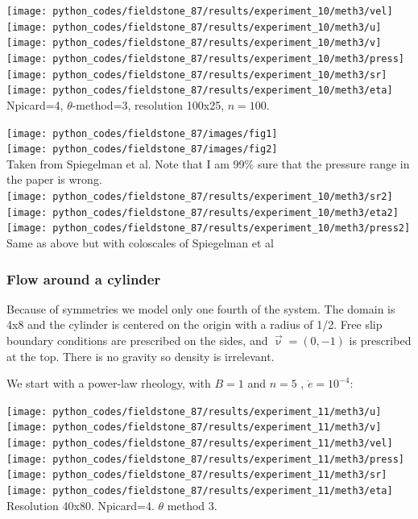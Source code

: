 \begin{center}
\texttt{[image: python\_codes/fieldstone\_87/results/experiment\_10/meth3/vel]}
\texttt{[image: python\_codes/fieldstone\_87/results/experiment\_10/meth3/u]}
\texttt{[image: python\_codes/fieldstone\_87/results/experiment\_10/meth3/v]}\\
\texttt{[image: python\_codes/fieldstone\_87/results/experiment\_10/meth3/press]}
\texttt{[image: python\_codes/fieldstone\_87/results/experiment\_10/meth3/sr]}
\texttt{[image: python\_codes/fieldstone\_87/results/experiment\_10/meth3/eta]}\\
{\captionfont Npicard=4, $\theta$-method=3, resolution 100x25, $n=100$.}
\end{center}

\begin{center}
\texttt{[image: python\_codes/fieldstone\_87/images/fig1]}\\
\texttt{[image: python\_codes/fieldstone\_87/images/fig2]}\\
{\captionfont Taken from Spiegelman et al. Note that I am 99\% sure that the pressure range in the paper is wrong.}\\
\texttt{[image: python\_codes/fieldstone\_87/results/experiment\_10/meth3/sr2]}
\texttt{[image: python\_codes/fieldstone\_87/results/experiment\_10/meth3/eta2]}
\texttt{[image: python\_codes/fieldstone\_87/results/experiment\_10/meth3/press2]}\\
{\captionfont Same as above but with coloscales of Spiegelman et al} 
\end{center}





\newpage
\subsubsection*{Flow around a cylinder}

Because of symmetries we model only one fourth of the system.
The domain is 4x8 and the cylinder is centered on the origin with a radius of 1/2.
Free slip boundary conditions are prescribed on the sides, and $\vec\upnu=(0,-1)$
is prescribed at the top. There is no gravity so density is irrelevant. 

We start with a power-law rheology, with $B=1$ and $n=5$ , $\dot{e}=10^{-4}$:
\begin{center}
\texttt{[image: python\_codes/fieldstone\_87/results/experiment\_11/meth3/u]}
\texttt{[image: python\_codes/fieldstone\_87/results/experiment\_11/meth3/v]}\\
\texttt{[image: python\_codes/fieldstone\_87/results/experiment\_11/meth3/vel]}
\texttt{[image: python\_codes/fieldstone\_87/results/experiment\_11/meth3/press]}\\
\texttt{[image: python\_codes/fieldstone\_87/results/experiment\_11/meth3/sr]}
\texttt{[image: python\_codes/fieldstone\_87/results/experiment\_11/meth3/eta]}\\
{\captionfont Resolution 40x80. Npicard=4. $\theta$ method 3. }
\end{center}

